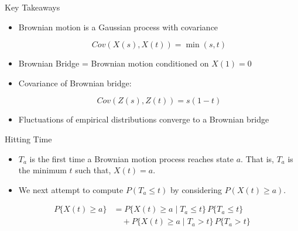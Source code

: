 \documentclass{beamer}
\begin{document}
	\begin{frame}{Key Takeaways}
		
		\begin{itemize}
			
			\item Brownian motion is a Gaussian process with covariance
			
			\[
			Cov(X(s),X(t)) = \min(s,t)
			\]
			
			\item Brownian Bridge = Brownian motion conditioned on $X(1)=0$
			
			\item Covariance of Brownian bridge:
			
			\[
			Cov(Z(s),Z(t)) = s(1-t)
			\]
			
			\item Fluctuations of empirical distributions converge to a Brownian bridge
			
		\end{itemize}
		
	\end{frame}
	
	\begin{frame}{Hitting Time}
		
		\begin{itemize}
			\item \(T_a\) is the first time a Brownian motion process reaches state $a$. That is, $T_a$ is the minimum $t$ such that, $X(t)=a$.
			\item We next attempt to compute $P(T_a\le t)$ by considering $P(X(t)\ge a)$.
		\end{itemize}
		
		\[
		\begin{aligned}
			P\{X(t)\ge a\}
			&=
			P\{X(t)\ge a \mid T_a \le t\}\,P\{T_a \le t\} \\
			&\quad + P\{X(t)\ge a \mid T_a > t\}\,P\{T_a > t\}
		\end{aligned}
		\]
		
	\end{frame}
	
\end{document}
